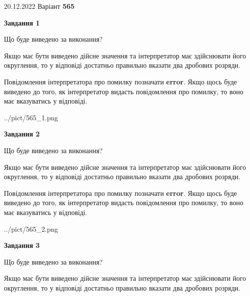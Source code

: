 \documentclass[12pt, ukrainian]{article}
\begin{document}
{20.12.2022 Варіант \No \textbf { 565 }\par}
{
\begin {Large}

{\begin {center}\textbf{Завдання 1}\end {center}}\par
Що буде виведено за виконання? \par

Якщо має бути виведено дійсне значення та інтерпретатор має здійснювати його округлення, 
то у відповіді достатньо правильно вказати два дробових розряди.

Повідомлення інтерпретатора про помилку позначати \textbf{error}.
Якщо щось буде виведено до того, як інтерпретатор видасть повідомлення про помилку, 
то воно має вказуватись у відповіді. \par

\begin{center}
	{../pict/565_1.png}
\end{center}
\newpage

{\begin {center}\textbf{Завдання 2}\end {center}}\par
Що буде виведено за виконання? \par

Якщо має бути виведено дійсне значення та інтерпретатор має здійснювати його округлення, 
то у відповіді достатньо правильно вказати два дробових розряди.

Повідомлення інтерпретатора про помилку позначати \textbf{error}.
Якщо щось буде виведено до того, як інтерпретатор видасть повідомлення про помилку, 
то воно має вказуватись у відповіді. \par

\begin{center}
	{../pict/565_2.png}
\end{center}
\newpage

{\begin {center}\textbf{Завдання 3}\end {center}}\par
Що буде виведено за виконання? \par

Якщо має бути виведено дійсне значення та інтерпретатор має здійснювати його округлення, 
то у відповіді достатньо правильно вказати два дробових розряди.


\end{Large}}
\end{document}
